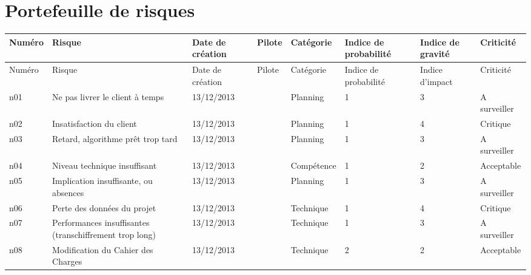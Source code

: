 \documentclass[a4paper,11pt,french]{article}
\begin{document}
\newpage
\section{Portefeuille de risques}

\begin{landscape}

\begin{longtable}{|m{1.5cm}|m{4cm}|m{3cm}|m{3.2cm}|m{2.2cm}|m{2cm}|m{2cm}|m{2.2cm}|}
\hline
\rowcolor[gray]{.8}
Numéro & Risque & Date de création & Pilote & Catégorie \footnotemark[1] & Indice de probabilité & Indice de gravité & Criticité \footnotemark[2] \\ 
\hline
\endfirsthead
\hline
\rowcolor[gray]{.8}
Numéro & Risque & Date de création & Pilote & Catégorie \footnotemark[1] & Indice de probabilité & Indice d'impact & Criticité \footnotemark[2] \\ 
\hline

\endhead
n01 & Ne pas livrer le client à temps & 13/12/2013 &  & Planning & 1 & 3 & A surveiller \\
\hline
n02 & Insatisfaction du client & 13/12/2013 & & Planning & 1 & 4 &  Critique \\
\hline
n03 & Retard, algorithme prêt trop tard & 13/12/2013 & & Planning & 1 & 3 & A surveiller \\
\hline
n04 & Niveau technique insuffisant & 13/12/2013 &  &  Compétence & 1 & 2 & Acceptable \\
\hline
n05 & Implication insuffisante, ou absences & 13/12/2013 &  & Planning & 1 & 3 & A surveiller \\
\hline
n06 & Perte des données du projet & 13/12/2013 &  & Technique & 1 & 4 & Critique \\
\hline
n07 & Performances insuffisantes (transchiffrement trop long) & 13/12/2013 &  & Technique & 1 & 3 & A surveiller \\
\hline
n08 & Modification du Cahier des Charges & 13/12/2013 &  & Technique & 2 & 2 & Acceptable \\
\hline

\end{longtable}
\end{landscape}

\newpage
\end{document}
